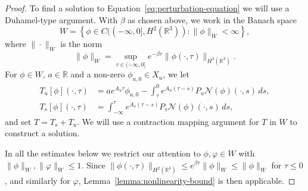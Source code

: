 \documentclass[11pt]{article}
\begin{document}
\begin{proof}
  To find a solution to Equation~\eqref{eq:perturbation-equation} we
  will use a Duhamel-type argument. With \(\beta\) as chosen above, we
  work in the Banach space
  \begin{equation*}
    W = \left\{\phi \in C((-\infty, 0], H^{2}(\mathbb{R}^{3})) \colon \|\phi\|_{W} < \infty\right\},
  \end{equation*}
  where \(\|\cdot\|_{W}\) is the norm
  \begin{equation*}
    \|\phi\|_{W} = \sup_{\tau \in (-\infty, 0]} e^{-\beta\tau} \|\phi(\cdot, \tau)\|_{H^{2}(\mathbb{R}^{3})}.
  \end{equation*}
  For \(\phi \in W\), \(a \in \mathbb{R}\) and a non-zero
  \(\phi_{u,0} \in X_{u}\), we let
  \begin{align*}
    T_{u}[\phi](\cdot, \tau) &= ae^{A_{u}\tau}\phi_{u,0} - \int_{\tau}^{0} e^{A_{u}(\tau - s)}P_{u}\mathcal{N}(\phi)(\cdot, s)\,ds,\\
    T_{s}[\phi](\cdot, \tau) &= \int_{-\infty}^{\tau} e^{A_{s}(\tau - s)}P_{s}\mathcal{N}(\phi)(\cdot, s)\,ds,
  \end{align*}
  and set \(T = T_{s} + T_{u}\). We will use a contraction mapping
  argument for \(T\) in \(W\) to construct a solution.

  In all the estimates below we restrict our attention to
  \(\phi, \varphi \in W\) with
  \(\|\phi\|_{W}, \|\varphi\|_{W} \leq 1\). Since
  \(\|\phi(\cdot, \tau)\|_{H^{2}(\mathbb{R}^{3})} \leq
  e^{\beta\tau}\|\phi\|_{W} \leq \|\phi\|_{W}\) for \(\tau \leq 0\),
  and similarly for \(\varphi\), Lemma~\ref{lemma:nonlinearity-bound}
  is then applicable.


\end{proof}
\end{document}
